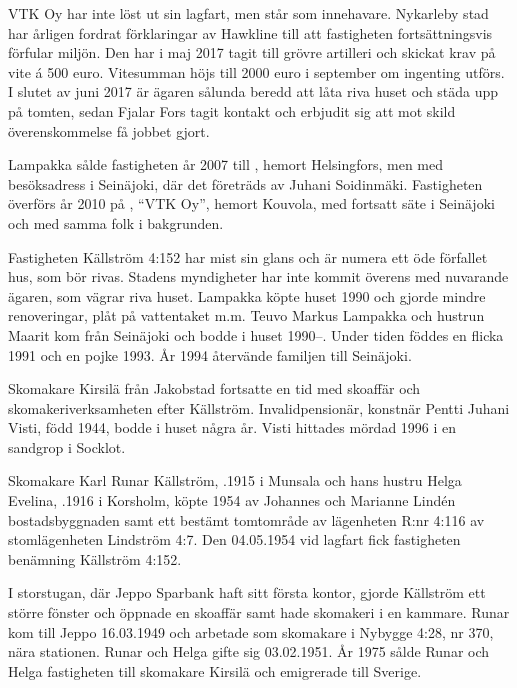 
VTK Oy har inte löst ut sin lagfart, men står som innehavare. Nykarleby stad har årligen fordrat förklaringar av Hawkline till att fastigheten fortsättningsvis förfular miljön. Den har i maj 2017 tagit till grövre artilleri och skickat krav på vite á 500 euro. Vitesumman höjs till 2000 euro i september om ingenting utförs. I slutet av juni 2017 är ägaren sålunda beredd att låta riva huset och städa upp på tomten, sedan Fjalar Fors tagit kontakt och erbjudit sig att mot skild överenskommelse få jobbet gjort.


Lampakka sålde fastigheten år 2007 till , hemort Helsingfors, men med besöksadress i Seinäjoki, där det företräds av Juhani Soidinmäki. Fastigheten överförs år 2010 på , ``VTK Oy'', hemort Kouvola, med fortsatt säte i Seinäjoki och med samma folk i bakgrunden.


Fastigheten Källström 4:152 har mist sin glans och är numera ett öde förfallet hus, som bör rivas. Stadens myndigheter har inte kommit överens med nuvarande ägaren, som vägrar riva huset. Lampakka köpte huset 1990 och gjorde mindre renoveringar, plåt på vattentaket m.m. Teuvo Markus Lampakka och hustrun Maarit kom från Seinäjoki och bodde i huset 1990--. Under tiden föddes en flicka 1991 och en pojke 1993. År 1994 återvände familjen till Seinäjoki.


Skomakare Kirsilä  från Jakobstad fortsatte en tid med skoaffär och skomakeriverksamheten	efter Källström. Invalidpensionär, konstnär Pentti Juhani Visti, född 1944, bodde i huset några år. Visti hittades mördad 1996 i	en sandgrop i Socklot.


Skomakare Karl Runar Källström, .1915 i Munsala och hans hustru Helga Evelina, .1916 i Korsholm, köpte 1954 av Johannes och Marianne Lindén bostadsbyggnaden samt ett bestämt tomtområde av lägenheten R:nr 4:116  av stomlägenheten Lindström 4:7. Den 04.05.1954 vid lagfart fick fastigheten benämning Källström 4:152.

I storstugan, där Jeppo Sparbank haft sitt första kontor, gjorde Källström ett större fönster och	öppnade en skoaffär samt hade skomakeri i en kammare. Runar kom till Jeppo 16.03.1949 och arbetade som skomakare i Nybygge 4:28, nr 370, nära stationen. Runar och Helga gifte sig 03.02.1951. År 1975 sålde Runar och Helga fastigheten till skomakare Kirsilä och emigrerade till Sverige.


